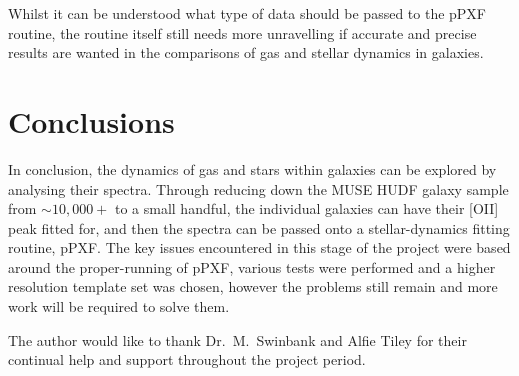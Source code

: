 \documentclass[12pt, twocolumn]{revtex4}    %
\begin{document}
Whilst it can be understood what type of data should be passed to the pPXF routine, the routine itself still needs more unravelling if accurate and precise results are wanted in the comparisons of gas and stellar dynamics in galaxies.


%

\section{Conclusions}
 
In conclusion, the dynamics of gas and stars within galaxies can be explored by analysing their spectra. Through reducing down the MUSE HUDF galaxy sample from $\sim10,000+$ to a small handful, the individual galaxies can have their [OII] peak fitted for, and then the spectra can be passed onto a stellar-dynamics fitting routine, pPXF. The key issues encountered in this stage of the project were based around the proper-running of pPXF, various tests were performed and a higher resolution template set was chosen, however the problems still remain and more work will be required to solve them.

\begin{acknowledgments}
The author would like to thank Dr.~M.~Swinbank and Alfie Tiley for their continual help and support throughout the project period.
\end{acknowledgments}



\end{document}
